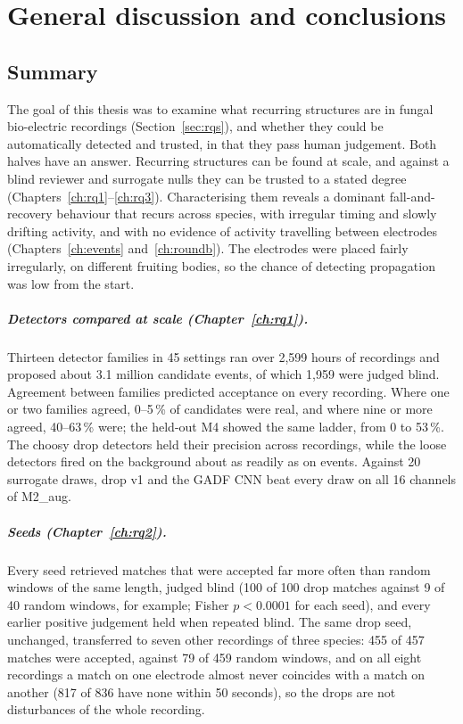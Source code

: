 \chapter{General discussion and conclusions}
\label{ch:discussion}

\section{Summary}

The goal of this thesis was to examine what recurring structures are in fungal bio-electric recordings (Section~\ref{sec:rqs}), and whether they could be automatically detected and trusted, in that they pass human judgement. Both halves have an answer. Recurring structures can be found at scale, and against a blind reviewer and surrogate nulls they can be trusted to a stated degree (Chapters~\ref{ch:rq1}--\ref{ch:rq3}). Characterising them reveals a dominant fall-and-recovery behaviour that recurs across species, with irregular timing and slowly drifting activity, and with no evidence of activity travelling between electrodes (Chapters~\ref{ch:events} and~\ref{ch:roundb}). The electrodes were placed fairly irregularly, on different fruiting bodies, so the chance of detecting propagation was low from the start.

\paragraph{Detectors compared at scale (Chapter~\ref{ch:rq1}).} Thirteen detector families in 45 settings ran over 2,599 hours of recordings and proposed about 3.1 million candidate events, of which 1,959 were judged blind. Agreement between families predicted acceptance on every recording. Where one or two families agreed, 0--5\,\% of candidates were real, and where nine or more agreed, 40--63\,\% were; the held-out M4 showed the same ladder, from 0 to 53\,\%. The choosy drop detectors held their precision across recordings, while the loose detectors fired on the background about as readily as on events. Against 20 surrogate draws, drop v1 and the GADF CNN beat every draw on all 16 channels of M2\_aug.

\paragraph{Seeds (Chapter~\ref{ch:rq2}).} Every seed retrieved matches that were accepted far more often than random windows of the same length, judged blind (100 of 100 drop matches against 9 of 40 random windows, for example; Fisher $p<0.0001$ for each seed), and every earlier positive judgement held when repeated blind. The same drop seed, unchanged, transferred to seven other recordings of three species: 455 of 457 matches were accepted, against 79 of 459 random windows, and on all eight recordings a match on one electrode almost never coincides with a match on another (817 of 836 have none within 50 seconds), so the drops are not disturbances of the whole recording.

